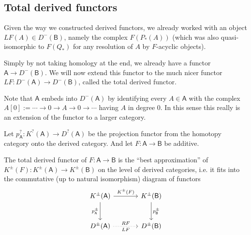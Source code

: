 \documentclass[fontsize=11pt,fleqn,a4paper]{scrartcl}
\begin{document}
\subsection{Total derived functors}

\begin{remark}
Given the way we constructed derived functors, we already worked with an object $LF(A)\in D^-(\mathsf{B})$, namely the complex $F(P_\ast(A))$ (which was also quasi-isomorphic to $F(Q_\ast)$ for any resolution of $A$ by $F$-acyclic objects).

Simply by not taking homology at the end, we already have a functor $\mathsf{A} \to D^-(\mathsf{B})$. We will now extend this functor to the much nicer functor $LF: D^-(\mathsf{A}) \to D^-(\mathsf{B})$, called the total derived functor.

Note that $\mathsf{A}$ embeds into $D^-(\mathsf{A})$ by identifying every $A\in\mathsf{A}$ with the complex $A[0] := \cdots \to 0 \to A\to 0\to\cdots$ having $A$ in degree $0$. In this sense this really is an extension of the functor to a larger category.
\end{remark}

\begin{definition}
Let $p_\mathsf{A}^?: K^?(\mathsf{A}) \to D^?(\mathsf{A})$ be the projection functor from the homotopy category onto the derived category. And let $F:\mathsf{A}\to\mathsf{B}$ be additive.

The total derived functor of $F:\mathsf{A}\to\mathsf{B}$ is the \enquote{best approximation} of $K^\pm(F): K^\pm(\mathsf{A}) \to K^\pm(\mathsf{B})$ on the level of derived categories, i.e. it fits into the commutative (up to natural isomorphism) diagram of functors
\[\begin{tikzcd}[sep = large]
K^{\pm}(\mathsf{A}) \ar[r,"K^\pm(F)"] \ar[d,"p_\mathsf{A}^\pm"'] & K^{\pm}(\mathsf{B}) \ar[d,"p_\mathsf{B}^\pm"] \\
D^\pm(\mathsf{A}) \ar[r,dotted,"LF"',"RF"] & D^\pm(\mathsf{B})
\end{tikzcd}\]
\end{definition}
\end{document}

